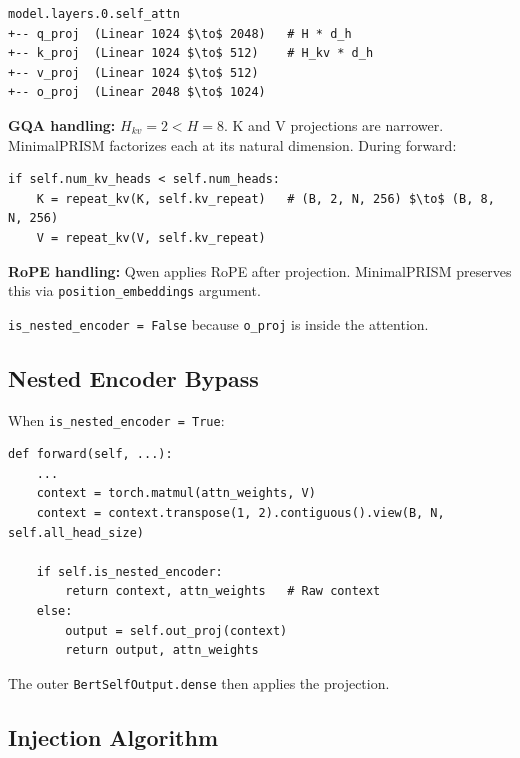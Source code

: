 \begin{lstlisting}
model.layers.0.self_attn
+-- q_proj  (Linear 1024 $\to$ 2048)   # H * d_h
+-- k_proj  (Linear 1024 $\to$ 512)    # H_kv * d_h
+-- v_proj  (Linear 1024 $\to$ 512)
+-- o_proj  (Linear 2048 $\to$ 1024)
\end{lstlisting}

\textbf{GQA handling:} $H_{kv} = 2 < H = 8$. K and V projections are narrower. 
MinimalPRISM factorizes each at its natural dimension. During forward:

\begin{lstlisting}
if self.num_kv_heads < self.num_heads:
    K = repeat_kv(K, self.kv_repeat)   # (B, 2, N, 256) $\to$ (B, 8, N, 256)
    V = repeat_kv(V, self.kv_repeat)
\end{lstlisting}

\textbf{RoPE handling:} Qwen applies RoPE after projection. MinimalPRISM preserves 
this via \texttt{position\_embeddings} argument.

\texttt{is\_nested\_encoder = False} because \texttt{o\_proj} is inside the attention.

\subsection{Nested Encoder Bypass}

When \texttt{is\_nested\_encoder = True}:

\begin{lstlisting}
def forward(self, ...):
    ...
    context = torch.matmul(attn_weights, V)
    context = context.transpose(1, 2).contiguous().view(B, N, self.all_head_size)
    
    if self.is_nested_encoder:
        return context, attn_weights   # Raw context
    else:
        output = self.out_proj(context)
        return output, attn_weights
\end{lstlisting}

The outer \texttt{BertSelfOutput.dense} then applies the projection.

\subsection{Injection Algorithm}

